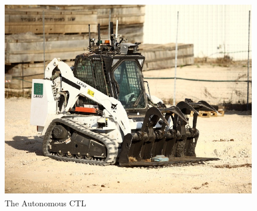 \documentclass[letterpaper]{article}
\newcommand\maNote[1]{\todo[inline, author=Maor, color=green]{#1}}
\begin{document}
{%



\begin{figure}[t]
\centering
\includegraphics[scale=0.38]{bobcat1.jpg}
\caption{The Autonomous CTL}
\label{fig:bobcat}
\end{figure}



}
\end{document}
